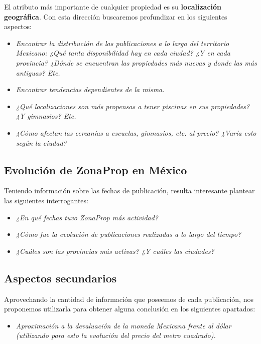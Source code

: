\documentclass[
10pt, %
a4paper, %
oneside, %
headinclude,footinclude, %
BCOR5mm, %
]{scrartcl}
\begin{document}
El atributo m\'as importante de cualquier propiedad es su \textbf{localizaci\'on geogr\'afica}. Con esta direcci\'on buscaremos profundizar en los siguientes aspectos:
\begin{itemize}
    \item \textit{Encontrar la distribuci\'on de las publicaciones a lo largo del territorio Mexicano: ¿Qu\'e tanta disponibilidad hay en cada ciudad? ¿Y en cada provincia? ¿D\'onde se encuentran las propiedades m\'as nuevas y donde las m\'as antiguas? Etc.}
    \item \textit{Encontrar tendencias dependientes de la misma.}
    \item \textit{¿Qu\'e localizaciones son m\'as propensas a tener piscinas en sus propiedades? ¿Y gimnasios? Etc.}
    \item \textit{¿C\'omo afectan las cercan\'ias a escuelas, gimnasios, etc. al precio? ¿Var\'ia esto seg\'un la ciudad?}
\end{itemize}

\subsection{Evoluci\'on de ZonaProp en M\'exico}

Teniendo informaci\'on sobre las fechas de publicaci\'on, resulta interesante plantear las siguientes interrogantes:
\begin{itemize}
    \item \textit{¿En qu\'e fechas tuvo ZonaProp m\'as actividad?}
    \item \textit{¿C\'omo fue la evoluci\'on de publicaciones realizadas a lo largo del tiempo?}
    \item \textit{¿Cu\'ales son las provincias m\'as activas? ¿Y cu\'ales las ciudades?}
    
\end{itemize}


\subsection{Aspectos secundarios}

Aprovechando la cantidad de informaci\'on que poseemos de cada publicaci\'on, nos proponemos utilizarla para obtener alguna conclusi\'on en los siguientes apartados:
\begin{itemize}
    \item \textit{Aproximaci\'on a la devaluaci\'on de la moneda Mexicana frente al d\'olar (utilizando para esto la evoluci\'on del precio del metro cuadrado).}
\end{itemize}
\end{document}
